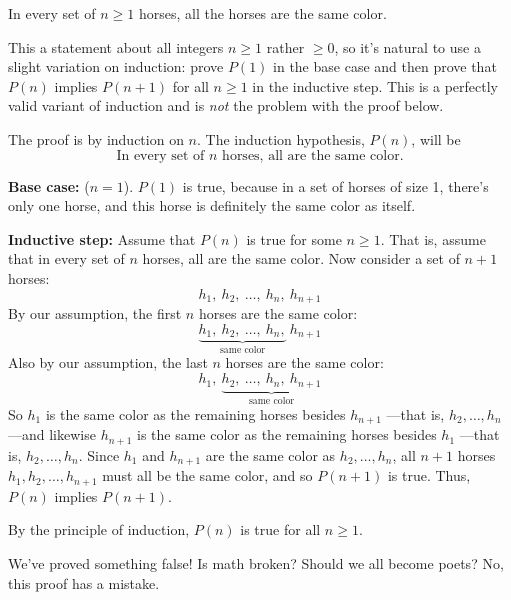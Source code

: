 \begin{falsethm}\label{horses}
In every set of $n \geq 1$ horses, all the horses are the same color.
\end{falsethm}

This a statement about all integers $n \geq 1$ rather $\geq 0$, so it's
natural to use a slight variation on induction: prove $P(1)$ in the base
case and then prove that $P(n)$ implies $P(n+1)$ for all $n \geq 1$ in the
inductive step.  This is a perfectly valid variant of induction and is
\emph{not} the problem with the proof below.

\begin{bogusproof}

The proof is by induction on $n$.  The induction hypothesis, $P(n)$,
will be
\begin{equation}\label{horsehyp}
\text{In every set of $n$ horses, all are the same color.}
\end{equation}

\textbf{Base case:} ($n=1$).  $P(1)$ is true, because in a set of horses
of size 1, there's only one horse, and this horse is definitely the same
color as itself.

\textbf{Inductive step:} Assume that $P(n)$ is true for some $n \geq 1$.
That is, assume that in every set of $n$ horses, all are the same color.
Now consider a set of $n+1$ horses:
%
\[
h_1,\ h_2,\ \dots,\ h_n,\ h_{n+1}
\]
%
By our assumption, the first $n$ horses are the same color:
%
\[
\underbrace{h_1,\ h_2,\ \dots,\ h_n,}_{\text{same color}}\ h_{n+1}
\]
%
Also by our assumption, the last $n$ horses are the same color:
%
\[
h_1,\ \underbrace{h_2,\ \dots,\ h_n,\ h_{n+1}}_{\text{same color}}
\]
%
So $h_1$ is the same color as the remaining horses besides $h_{n+1}$
---that is, $h_2, \dots, h_n$ ---and likewise $h_{n+1}$ is the same
color as the remaining horses besides $h_1$ ---that is, $h_2, \dots,
h_n$.  Since $h_1$ and $h_{n+1}$ are the same color as $h_2, \dots,
h_n$, all $n+1$ horses $h_1, h_2, \dots, h_{n+1}$ must all be the
same color, and so $P(n+1)$ is true.  Thus, $P(n)$ implies $P(n+1)$.

By the principle of induction, $P(n)$ is true for all $n \geq 1$.
\end{bogusproof}
We've proved something false!  Is math broken?  Should we all become
poets?  No, this proof has a mistake.



